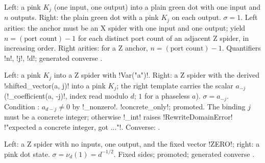 Left: a pink $K_j$ (one input, one output) into a plain green dot with one input and $n$ outputs.
Right: the plain green dot with a pink $K_j$ on each output. $\sigma=1$. Left arities: the anchor
must be an X spider with one input and one output; yield $n=(\text{port count})-1$ for each
distinct port count of an adjacent Z spider, in increasing order. Right arities: for a Z anchor,
$n=(\text{port count})-1$. Quantifiers \code!n!, \code!j!, \code!d!; generated converse
.

Left: a pink $K_j$ into a Z spider with \py!Var("a")!. Right: a Z spider with the derived
\py!shifted_vector(a, j)! into a pink $K_j$; the right template carries the scalar $a_{-j}$
(\py!_coefficient(a, -j)!, index read modulo $d$; $1$ for a phaseless $a$). $\sigma=a_{-j}$.
Condition : $a_{d-j}\neq 0$ by \py!_nonzero!. \py!concrete_only!;
promoted. The binding $j$ must be a concrete integer; otherwise \py!_int! raises
\py!RewriteDomainError! \code!"expected a concrete integer, got ..."!. Converse:
.

Left: a Z spider with no inputs, one output, and the fixed vector \py!ZERO!; right: a pink dot
state. $\sigma=\nu_d(1)=d^{-1/2}$. Fixed sides; promoted; generated converse
.

